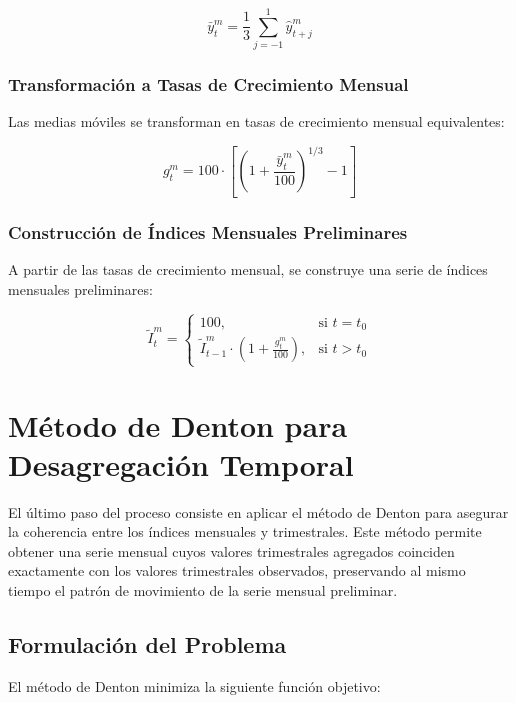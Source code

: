 \documentclass[12pt,a4paper]{article}
\begin{document}
\begin{equation}
\bar{y}_t^m = \frac{1}{3} \sum_{j=-1}^{1} \hat{y}_{t+j}^m
\end{equation}

\subsubsection{Transformación a Tasas de Crecimiento Mensual}

Las medias móviles se transforman en tasas de crecimiento mensual equivalentes:

\begin{equation}
g_t^m = 100 \cdot \left[\left(1 + \frac{\bar{y}_t^m}{100}\right)^{1/3} - 1\right]
\end{equation}

\subsubsection{Construcción de Índices Mensuales Preliminares}

A partir de las tasas de crecimiento mensual, se construye una serie de índices mensuales preliminares:

\begin{equation}
\tilde{I}_t^m = 
\begin{cases}
    100, & \text{si } t = t_0 \\
    \tilde{I}_{t-1}^m \cdot \left(1 + \frac{g_t^m}{100}\right), & \text{si } t > t_0
\end{cases}
\end{equation}

\section{Método de Denton para Desagregación Temporal}

El último paso del proceso consiste en aplicar el método de Denton para asegurar la coherencia entre los índices mensuales y trimestrales. Este método permite obtener una serie mensual cuyos valores trimestrales agregados coinciden exactamente con los valores trimestrales observados, preservando al mismo tiempo el patrón de movimiento de la serie mensual preliminar.

\subsection{Formulación del Problema}

El método de Denton minimiza la siguiente función objetivo:
\end{document}
